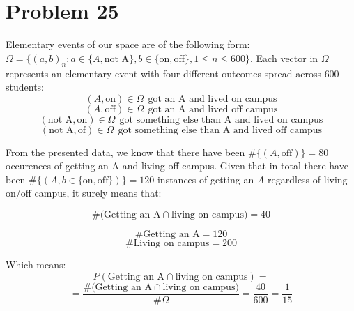 \documentclass{article}
\begin{document}
\section*{Problem 25}
Elementary events of our space are of the following form: \(\Omega = \{(a, b)_{n}: a \in \{A, \mbox{not A}\}, b \in \{\mbox{on}, \mbox{off}\}, 1 \leq n \leq 600 \}\).
Each vector in \(\Omega\) represents an elementary event with four different outcomes spread across \(600\) students:
\begin{equation*}
    (A, \mbox{on}) \in \Omega \ \ \mbox{got an A and lived on campus}
\end{equation*}
\begin{equation*}
    (A, \mbox{off}) \in \Omega \ \ \mbox{got an A and lived off campus}
\end{equation*}
\begin{equation*}
    (\mbox{not A}, \mbox{on}) \in \Omega \ \ \mbox{got something else than A and lived on campus}
\end{equation*}
\begin{equation*}
    (\mbox{not A}, \mbox{of}) \in \Omega \ \ \mbox{got something else than A and lived off campus}
\end{equation*}

From the presented data, we know that there have been \(\# \{(A, \mbox{off})\} = 80\) occurences of getting an
A and living off campus. Given that in total there have been \(\# \{(A, b \in \{\mbox{on}, \mbox{off}\} )\} = 120\)
instances of getting an \(A\) regardless of living on/off campus, it surely means that:


\begin{equation*}
    \# \Big(\mbox{Getting an A} \cap \mbox{living on campus}\Big) = 40
\end{equation*}

\begin{equation*}
    \# \mbox{Getting an A} = 120
\end{equation*}
\begin{equation*}
    \# \mbox{Living on campus} = 200
\end{equation*}

Which means:
\begin{equation*}
    P(\mbox{Getting an A} \cap \mbox{living on campus}) =
\end{equation*}
\begin{equation*}
    = \frac{\#\Big(\mbox{Getting an A} \cap \mbox{living on campus}\Big)}{\# \Omega} = \frac{40}{600} = \frac{1}{15}
\end{equation*}
\end{document}

